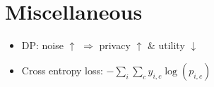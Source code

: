 \section{Miscellaneous}
\begin{itemize}
    \item DP: noise $\uparrow$ $\Rightarrow$ privacy $\uparrow$ \& utility $\downarrow$
    \item Cross entropy loss: $-\sum_i\sum_c y_{i,c}\log(p_{i,c})$
\end{itemize}
